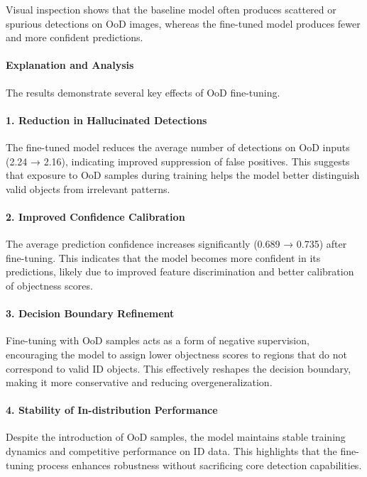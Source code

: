 Visual inspection shows that the baseline model often produces scattered or spurious detections on OoD images, whereas the fine-tuned model produces fewer and more confident predictions.

\paragraph{Explanation and Analysis}

The results demonstrate several key effects of OoD fine-tuning.

\paragraph{1. Reduction in Hallucinated Detections}

The fine-tuned model reduces the average number of detections on OoD inputs (2.24 → 2.16), indicating improved suppression of false positives. This suggests that exposure to OoD samples during training helps the model better distinguish valid objects from irrelevant patterns.

\paragraph{2. Improved Confidence Calibration}

The average prediction confidence increases significantly (0.689 → 0.735) after fine-tuning. This indicates that the model becomes more confident in its predictions, likely due to improved feature discrimination and better calibration of objectness scores.

\paragraph{3. Decision Boundary Refinement}

Fine-tuning with OoD samples acts as a form of negative supervision, encouraging the model to assign lower objectness scores to regions that do not correspond to valid ID objects. This effectively reshapes the decision boundary, making it more conservative and reducing overgeneralization.

\paragraph{4. Stability of In-distribution Performance}

Despite the introduction of OoD samples, the model maintains stable training dynamics and competitive performance on ID data. This highlights that the fine-tuning process enhances robustness without sacrificing core detection capabilities.

